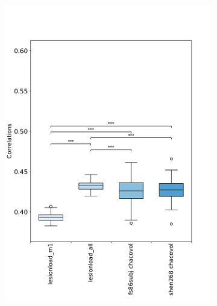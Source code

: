 \documentclass[10pt]{article}
\begin{document}
\begin{figure}
\begin{subfigure}{0.5\textwidth}
  \centering
  \includegraphics[width=1\linewidth]{figures/analysis_1_boxplots_correlations.pdf}
  \caption{}
  \label{fig:sfig1}
\end{subfigure}
\begin{subfigure}{0.5\textwidth}
  \centering

\end{subfigure}
\end{figure}
\end{document}
